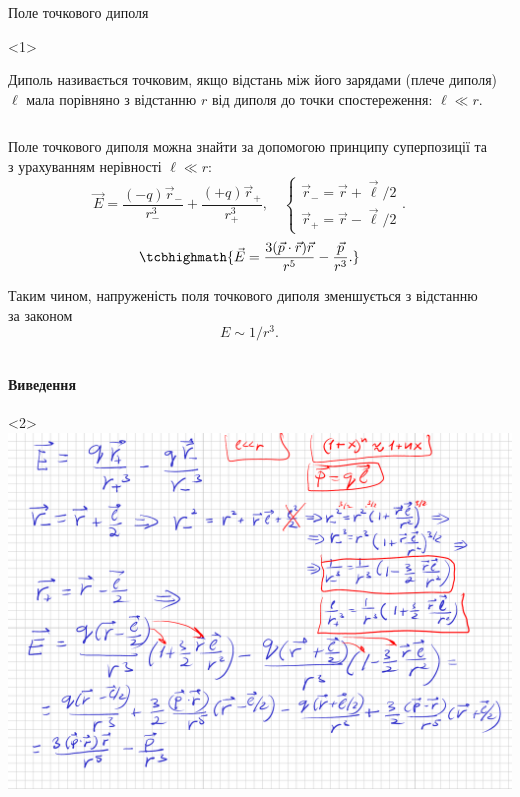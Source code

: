 \documentclass{beamer}
\begin{document}
\begin{frame}{Поле точкового диполя}
	\begin{onlyenv}
		\begin{block}{}\justifying
			Диполь називається \alert{точковим}, якщо відстань між його зарядами
			(плече диполя) $\ell$ мала порівняно з відстанню $r$ від диполя до
			точки спостереження: $\ell \ll r$.
		\end{block}

		\begin{columns}
			\begin{column}{0.75\linewidth}
				\begin{block}{}\justifying
					Поле точкового диполя можна знайти за допомогою принципу
					суперпозиції
					та з урахуванням нерівності $\ell \ll r$:
					\begin{equation*}
						\vec{E} = \frac{(-q)\vec{r}_-}{r_-^3} +
						\frac{(+q)\vec{r}_+}{r_+^3}, \quad
						\begin{cases}
							\vec{r}_- =  \vec{r} + \vec{\ell}/2 \\
							\vec{r}_+ =  \vec{r} - \vec{\ell}/2
						\end{cases}.
					\end{equation*}
					\begin{equation*}
						\tcbhighmath{
							\vec{E} = \frac{3(\vec{p}\cdot\vec{r})\vec{r}}{r^5} -
							\frac{\vec{p}}{r^3}.
						}
					\end{equation*}

					Таким чином, напруженість поля точкового диполя зменшується з
					відстанню за законом
					\begin{equation*}
						E \sim 1/{r^3}.
					\end{equation*}
				\end{block}
			\end{column}
			\begin{column}{0.25\linewidth}\centering
				
			\end{column}
		\end{columns}
	\end{onlyenv}
	\framesubtitle<2>{Виведення}
	\begin{onlyenv}
		\includegraphics[width=\linewidth]{dipolefield.pdf}
	\end{onlyenv}
\end{frame}
\end{document}
